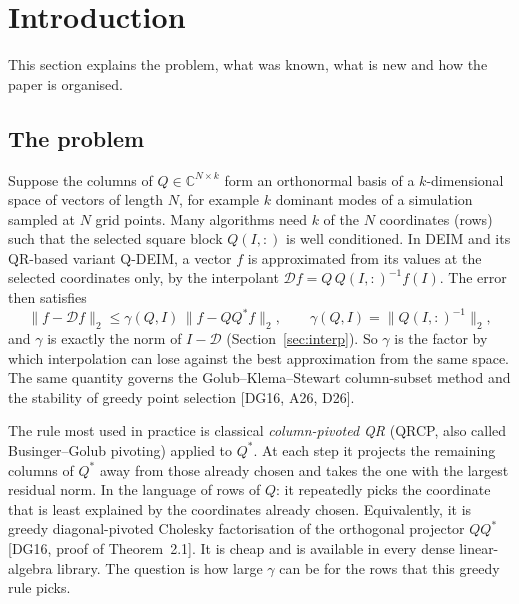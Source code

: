 \documentclass[11pt,a4paper]{article}
\theoremstyle{definition}
\numberwithin{equation}{section}
\newcommand{\C}{\mathbb C}
\begin{document}
\section{Introduction}\label{sec:intro}

This section explains the problem, what was known, what is new and how the paper is organised.

\subsection{The problem}
Suppose the columns of $Q\in\C^{N\times k}$ form an orthonormal basis of a $k$-dimensional space of vectors of
length $N$, for example $k$ dominant modes of a simulation sampled at $N$ grid points. Many algorithms need $k$
of the $N$ coordinates (rows) such that the selected square block $Q(I,:)$ is well conditioned. In DEIM and its
QR-based variant Q-DEIM, a vector $f$ is approximated from its values at the selected coordinates only, by the
interpolant $\mathcal D f=Q\,Q(I,:)^{-1}f(I)$. The error then satisfies
\begin{equation}\label{eq:intro-deim}
  \|f-\mathcal D f\|_2\le \gamma(Q,I)\,\|f-QQ^*f\|_2,\qquad \gamma(Q,I)=\|Q(I,:)^{-1}\|_2,
\end{equation}
and $\gamma$ is exactly the norm of $I-\mathcal D$ (Section~\ref{sec:interp}). So $\gamma$ is the factor by which
interpolation can lose against the best approximation from the same space. The same quantity governs the
Golub--Klema--Stewart column-subset method and the stability of greedy point selection [DG16, A26, D26].

The rule most used in practice is classical \emph{column-pivoted QR} (QRCP, also called Businger--Golub pivoting)
applied to $Q^*$. At each step it projects the remaining columns of $Q^*$ away from those already chosen and takes
the one with the largest residual norm. In the language of rows of $Q$: it repeatedly picks the coordinate that is
least explained by the coordinates already chosen. Equivalently, it is greedy diagonal-pivoted Cholesky
factorisation of the orthogonal projector $QQ^*$ [DG16, proof of Theorem~2.1]. It is cheap and is available in every dense linear-algebra
library. The question is how large $\gamma$ can be for the rows that this greedy rule picks.
\end{document}
